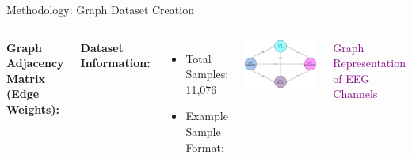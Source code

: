 \begin{frame}{Methodology: Graph Dataset Creation}

    \begin{columns}
    
        \textbf{Graph Adjacency Matrix (Edge Weights):}
        \centering
        \renewcommand{\arraystretch}{1.2}

        \vspace{8pt}

        \textbf{Dataset Information:}
        \begin{itemize}
            \item Total Samples: 11,076
            \item Example Sample Format:
        \end{itemize}

  
  
      

        \centering
        \includegraphics[width=0.85\linewidth]{figures/Graph Weightage.png} %

        {\textcolor{purple}{\small Graph Representation of EEG Channels}}

    \end{columns}
\end{frame}



